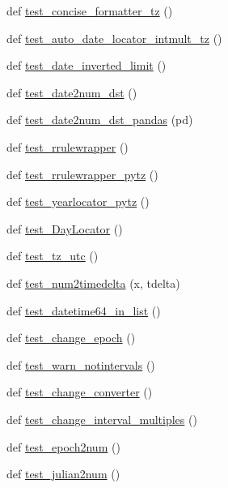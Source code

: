 \begin{DoxyCompactItemize}
\item 
def \hyperlink{namespacematplotlib_1_1tests_1_1test__dates_ad4c9c4c659efc075a90b16ea40975744}{test\+\_\+concise\+\_\+formatter\+\_\+tz} ()
\item 
def \hyperlink{namespacematplotlib_1_1tests_1_1test__dates_a9e2292471b337dfac120bbdabd5bfbbe}{test\+\_\+auto\+\_\+date\+\_\+locator\+\_\+intmult\+\_\+tz} ()
\item 
def \hyperlink{namespacematplotlib_1_1tests_1_1test__dates_a88ec28e00af4cf7b0bf76e6aed48d808}{test\+\_\+date\+\_\+inverted\+\_\+limit} ()
\item 
def \hyperlink{namespacematplotlib_1_1tests_1_1test__dates_adca13560b0722f90b7a6cc4f388f7ebb}{test\+\_\+date2num\+\_\+dst} ()
\item 
def \hyperlink{namespacematplotlib_1_1tests_1_1test__dates_ad3617f1ca30a72565d9a7abf89265765}{test\+\_\+date2num\+\_\+dst\+\_\+pandas} (pd)
\item 
def \hyperlink{namespacematplotlib_1_1tests_1_1test__dates_a5e1d4e34e1366f9ac7b3513ae65b7494}{test\+\_\+rrulewrapper} ()
\item 
def \hyperlink{namespacematplotlib_1_1tests_1_1test__dates_aeee5a4e31c2f81f2cfe101a59f56f072}{test\+\_\+rrulewrapper\+\_\+pytz} ()
\item 
def \hyperlink{namespacematplotlib_1_1tests_1_1test__dates_a80ceda947c5bc6eb719f33867b135f7e}{test\+\_\+yearlocator\+\_\+pytz} ()
\item 
def \hyperlink{namespacematplotlib_1_1tests_1_1test__dates_aa23422312ae33fb731508ad64e169333}{test\+\_\+\+Day\+Locator} ()
\item 
def \hyperlink{namespacematplotlib_1_1tests_1_1test__dates_afe87dd4fbdada5cc0e8903f223962263}{test\+\_\+tz\+\_\+utc} ()
\item 
def \hyperlink{namespacematplotlib_1_1tests_1_1test__dates_a6ed24c2c122c2e32d6707d97ee5772da}{test\+\_\+num2timedelta} (x, tdelta)
\item 
def \hyperlink{namespacematplotlib_1_1tests_1_1test__dates_afbf50eca0b12c2ea199318fdafa0c076}{test\+\_\+datetime64\+\_\+in\+\_\+list} ()
\item 
def \hyperlink{namespacematplotlib_1_1tests_1_1test__dates_a76d3ffc4a80e7c30ef84f986d1f8f279}{test\+\_\+change\+\_\+epoch} ()
\item 
def \hyperlink{namespacematplotlib_1_1tests_1_1test__dates_a751d83924c5d05bc4838d5d96e96b929}{test\+\_\+warn\+\_\+notintervals} ()
\item 
def \hyperlink{namespacematplotlib_1_1tests_1_1test__dates_a3a4c1a3b7b7e4450037415bed548fd4b}{test\+\_\+change\+\_\+converter} ()
\item 
def \hyperlink{namespacematplotlib_1_1tests_1_1test__dates_a563cf2ed7b48f2dd510dee376fb1d4ab}{test\+\_\+change\+\_\+interval\+\_\+multiples} ()
\item 
def \hyperlink{namespacematplotlib_1_1tests_1_1test__dates_a167b3927ed92d7a58ab2e6ba46022ad5}{test\+\_\+epoch2num} ()
\item 
def \hyperlink{namespacematplotlib_1_1tests_1_1test__dates_a7a6d33b354ebfda54b1c5710c5061e00}{test\+\_\+julian2num} ()
\end{DoxyCompactItemize}


